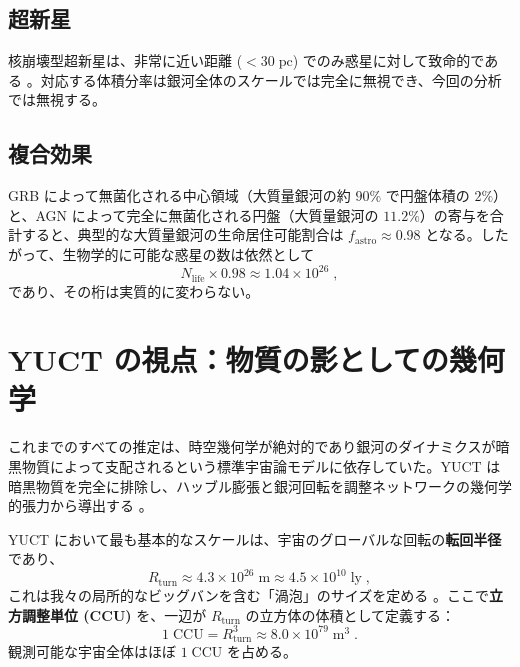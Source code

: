 \documentclass[11pt,a4paper]{article}
\newcommand{\CCU}{\text{CCU}}
\begin{document}
	\subsection{超新星}
	\label{sec:sne}
	核崩壊型超新星は、非常に近い距離 (\(< 30\;\mathrm{pc}\)) でのみ惑星に対して致命的である \citep{ThomasYelland2023}。対応する体積分率は銀河全体のスケールでは完全に無視でき、今回の分析では無視する。
	
	\subsection{複合効果}
	\label{sec:total_astro}
	GRB によって無菌化される中心領域（大質量銀河の約 \(90\%\) で円盤体積の \(2\%\)）と、AGN によって完全に無菌化される円盤（大質量銀河の \(11.2\%\)）の寄与を合計すると、典型的な大質量銀河の生命居住可能割合は \(f_{\mathrm{astro}} \approx 0.98\) となる。したがって、生物学的に可能な惑星の数は依然として
	\begin{equation}
		N_{\mathrm{life}} \times 0.98 \approx 1.04\times 10^{26}\; ,
	\end{equation}
	であり、その桁は実質的に変わらない。
	
	\section{YUCT の視点：物質の影としての幾何学}
	\label{sec:yuct_geometry}
	これまでのすべての推定は、時空幾何学が絶対的であり銀河のダイナミクスが暗黒物質によって支配されるという標準宇宙論モデルに依存していた。YUCT は暗黒物質を完全に排除し、ハッブル膨張と銀河回転を調整ネットワークの幾何学的張力から導出する \citep{YUCT,AppGravity}。
	
	YUCT において最も基本的なスケールは、宇宙のグローバルな回転の\textbf{転回半径}であり、
	\begin{equation}
		R_{\mathrm{turn}} \approx 4.3\times 10^{26}\;\mathrm{m}
		\approx 4.5\times 10^{10}\;\mathrm{ly}\; ,
	\end{equation}
	これは我々の局所的なビッグバンを含む「渦泡」のサイズを定める \citep{AppOmega}。ここで\textbf{立方調整単位 (CCU)} を、一辺が \(R_{\mathrm{turn}}\) の立方体の体積として定義する：
	\begin{equation}
		1\;\CCU = R_{\mathrm{turn}}^{3} \approx 8.0\times 10^{79}\;\mathrm{m}^{3}\; .
	\end{equation}
	観測可能な宇宙全体はほぼ \(1\;\CCU\) を占める。
	
\end{document}
